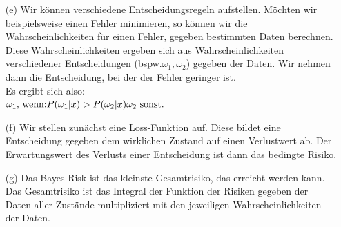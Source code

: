 \documentclass[a4paper]{scrartcl}
\begin{document}
\begin{itemize}
		
		\item[(e)] Wir können verschiedene Entscheidungsregeln aufstellen. Möchten wir beispielsweise einen Fehler minimieren, so können wir die Wahrscheinlichkeiten für einen Fehler, gegeben bestimmten Daten berechnen.\\
		Diese Wahrscheinlichkeiten ergeben sich aus Wahrscheinlichkeiten verschiedener Entscheidungen (bspw.$\omega_1, \omega_2$) gegeben der Daten. Wir nehmen dann die Entscheidung, bei der der Fehler geringer ist.\\
		Es ergibt sich also:\\
		$
		\omega_1 \text{, wenn:} P(\omega_1|x) > P(\omega_2|x)\\
		\omega_2 \text{ sonst.}
		$\\
		
		\item[(f)] Wir stellen zunächst eine Loss-Funktion auf. Diese bildet eine Entscheidung gegeben dem wirklichen Zustand auf einen Verlustwert ab. Der Erwartungswert des Verlusts einer Entscheidung ist dann das bedingte Risiko.
		
		
		
		\item[(g)] Das Bayes Risk ist das kleinste Gesamtrisiko, das erreicht werden kann. Das Gesamtrisiko ist das Integral der Funktion der Risiken gegeben der Daten aller Zustände multipliziert mit den jeweiligen Wahrscheinlichkeiten der Daten.
		
		
		
		
	\end{itemize}
	
\end{document}
